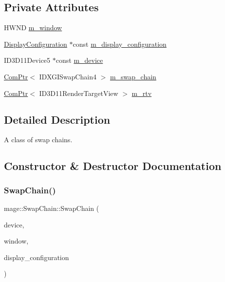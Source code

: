\subsection*{Private Attributes}
\begin{DoxyCompactItemize}
\item 
H\+W\+ND \hyperlink{classmage_1_1_swap_chain_a3eb5ca77874f177e48ac2b77a97cb382}{m\+\_\+window}
\item 
\hyperlink{classmage_1_1_display_configuration}{Display\+Configuration} $\ast$const \hyperlink{classmage_1_1_swap_chain_ac1aa833943aa6bfe464da32316f7096f}{m\+\_\+display\+\_\+configuration}
\item 
I\+D3\+D11\+Device5 $\ast$const \hyperlink{classmage_1_1_swap_chain_a169f9613c42c3cad0ea83e9535676cd0}{m\+\_\+device}
\item 
\hyperlink{namespacemage_ae74f374780900893caa5555d1031fd79}{Com\+Ptr}$<$ I\+D\+X\+G\+I\+Swap\+Chain4 $>$ \hyperlink{classmage_1_1_swap_chain_a826bde72349ca10f7c60ca39d68dc2b2}{m\+\_\+swap\+\_\+chain}
\item 
\hyperlink{namespacemage_ae74f374780900893caa5555d1031fd79}{Com\+Ptr}$<$ I\+D3\+D11\+Render\+Target\+View $>$ \hyperlink{classmage_1_1_swap_chain_a87610dab11ac73b2e5c2510e013640ac}{m\+\_\+rtv}
\end{DoxyCompactItemize}


\subsection{Detailed Description}
A class of swap chains. 

\subsection{Constructor \& Destructor Documentation}
\hypertarget{classmage_1_1_swap_chain_a81bde3f34bbcd36e4e1dd053a2c0f736}{}\label{classmage_1_1_swap_chain_a81bde3f34bbcd36e4e1dd053a2c0f736} 
\subsubsection{\texorpdfstring{Swap\+Chain()}{SwapChain()}\hspace{0.1cm}{\footnotesize\ttfamily [1/3]}}
{\footnotesize\ttfamily mage\+::\+Swap\+Chain\+::\+Swap\+Chain (\begin{DoxyParamCaption}\item[{I\+D3\+D11\+Device5 $\ast$}]{device,  }\item[{H\+W\+ND}]{window,  }\item[{\hyperlink{classmage_1_1_display_configuration}{Display\+Configuration} $\ast$}]{display\+\_\+configuration }\end{DoxyParamCaption})\hspace{0.3cm}{\ttfamily [explicit]}}

